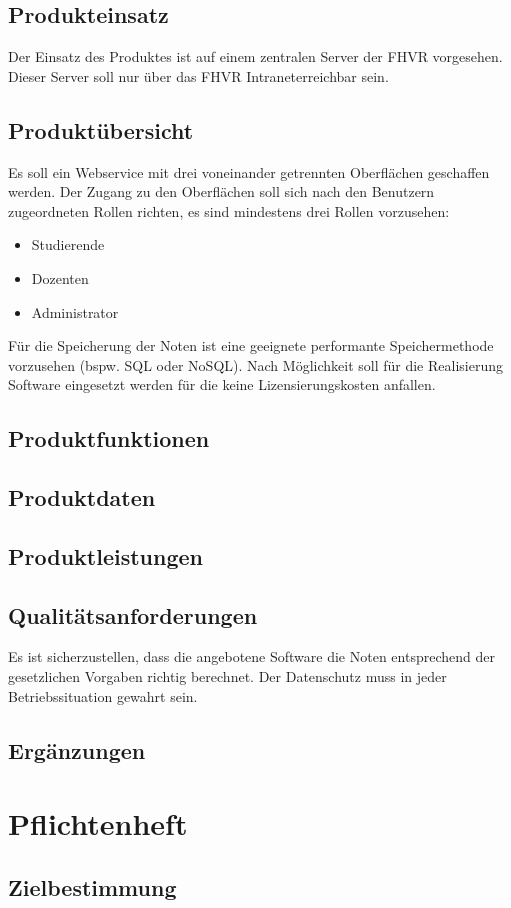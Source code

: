 \documentclass[12pt,a4paper]{scrreprt}
\begin{document}
\subsection{Produkteinsatz}
Der Einsatz des Produktes ist auf einem zentralen Server der FHVR vorgesehen. Dieser Server soll nur über das \glqq FHVR Intranet\grqq erreichbar sein.
\subsection{Produktübersicht}
Es soll ein Webservice mit drei voneinander getrennten Oberflächen geschaffen werden. Der Zugang zu den Oberflächen soll sich nach den Benutzern zugeordneten Rollen richten, es sind mindestens drei Rollen vorzusehen:
\begin{itemize}
\item Studierende
\item Dozenten
\item Administrator
\end{itemize}
Für die Speicherung der Noten ist eine geeignete performante Speichermethode vorzusehen (bspw. SQL oder NoSQL).
Nach Möglichkeit soll für die Realisierung Software eingesetzt werden für die keine Lizensierungskosten anfallen.
\subsection{Produktfunktionen}
\subsection{Produktdaten}
\subsection{Produktleistungen}
\subsection{Qualitätsanforderungen}
Es ist sicherzustellen, dass die angebotene Software die Noten entsprechend der gesetzlichen Vorgaben richtig berechnet. Der Datenschutz muss in jeder Betriebssituation gewahrt sein.
\subsection{Ergänzungen}
\section{Pflichtenheft}
\subsection{Zielbestimmung}
\end{document}
